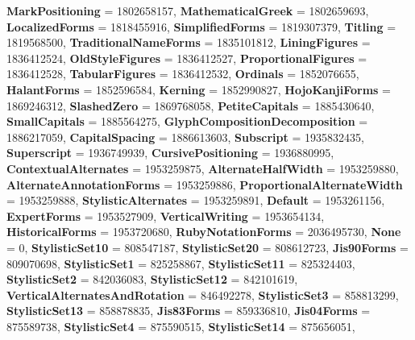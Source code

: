 \begin{DoxyCompactItemize}
{\bfseries Mark\+Positioning} = 1802658157, 
{\bfseries Mathematical\+Greek} = 1802659693, 
{\bfseries Localized\+Forms} = 1818455916, 
{\bfseries Simplified\+Forms} = 1819307379, 
\newline
{\bfseries Titling} = 1819568500, 
{\bfseries Traditional\+Name\+Forms} = 1835101812, 
{\bfseries Lining\+Figures} = 1836412524, 
{\bfseries Old\+Style\+Figures} = 1836412527, 
\newline
{\bfseries Proportional\+Figures} = 1836412528, 
{\bfseries Tabular\+Figures} = 1836412532, 
{\bfseries Ordinals} = 1852076655, 
{\bfseries Halant\+Forms} = 1852596584, 
\newline
{\bfseries Kerning} = 1852990827, 
{\bfseries Hojo\+Kanji\+Forms} = 1869246312, 
{\bfseries Slashed\+Zero} = 1869768058, 
{\bfseries Petite\+Capitals} = 1885430640, 
\newline
{\bfseries Small\+Capitals} = 1885564275, 
{\bfseries Glyph\+Composition\+Decomposition} = 1886217059, 
{\bfseries Capital\+Spacing} = 1886613603, 
{\bfseries Subscript} = 1935832435, 
\newline
{\bfseries Superscript} = 1936749939, 
{\bfseries Cursive\+Positioning} = 1936880995, 
{\bfseries Contextual\+Alternates} = 1953259875, 
{\bfseries Alternate\+Half\+Width} = 1953259880, 
\newline
{\bfseries Alternate\+Annotation\+Forms} = 1953259886, 
{\bfseries Proportional\+Alternate\+Width} = 1953259888, 
{\bfseries Stylistic\+Alternates} = 1953259891, 
{\bfseries Default} = 1953261156, 
\newline
{\bfseries Expert\+Forms} = 1953527909, 
{\bfseries Vertical\+Writing} = 1953654134, 
{\bfseries Historical\+Forms} = 1953720680, 
{\bfseries Ruby\+Notation\+Forms} = 2036495730, 
\newline
{\bfseries None} = 0, 
{\bfseries Stylistic\+Set10} = 808547187, 
{\bfseries Stylistic\+Set20} = 808612723, 
{\bfseries Jis90\+Forms} = 809070698, 
\newline
{\bfseries Stylistic\+Set1} = 825258867, 
{\bfseries Stylistic\+Set11} = 825324403, 
{\bfseries Stylistic\+Set2} = 842036083, 
{\bfseries Stylistic\+Set12} = 842101619, 
\newline
{\bfseries Vertical\+Alternates\+And\+Rotation} = 846492278, 
{\bfseries Stylistic\+Set3} = 858813299, 
{\bfseries Stylistic\+Set13} = 858878835, 
{\bfseries Jis83\+Forms} = 859336810, 
\newline
{\bfseries Jis04\+Forms} = 875589738, 
{\bfseries Stylistic\+Set4} = 875590515, 
{\bfseries Stylistic\+Set14} = 875656051, 

\end{DoxyCompactItemize}
